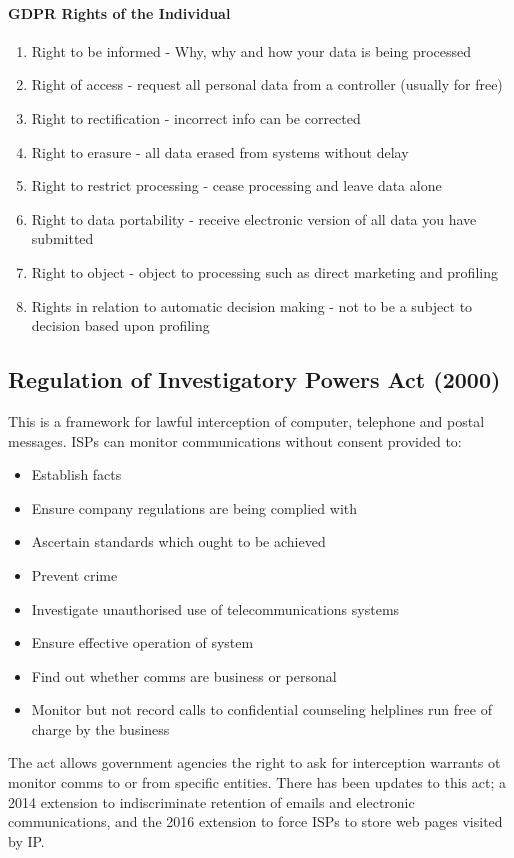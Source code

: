 \paragraph{GDPR Rights of the Individual}
\begin{enumerate}
	\item Right to be informed - Why, why and how your data is being processed
	\item Right of access - request all personal data from a controller (usually for free)
	\item Right to rectification - incorrect info can be corrected
	\item Right to erasure - all data erased from systems without delay
	\item Right to restrict processing - cease processing and leave data alone
	\item Right to data portability - receive electronic version of all data you have submitted
	\item Right to object - object to processing such as direct marketing and profiling
	\item Rights in relation to automatic decision making - not to be a subject to decision based upon profiling
\end{enumerate}
\subsection{Regulation of Investigatory Powers Act (2000)} This is a framework for lawful interception of computer, telephone and postal messages. ISPs can monitor communications without consent provided to:
\begin{itemize}
	\item Establish facts
	\item Ensure company regulations are being complied with
	\item Ascertain standards which ought to be achieved
	\item Prevent crime
	\item Investigate unauthorised use of telecommunications systems
	\item Ensure effective operation of system
	\item Find out whether comms are business or personal
	\item Monitor but not record calls to confidential counseling helplines run free of charge by the business
\end{itemize}
The act allows government agencies the right to ask for interception warrants ot monitor comms to or from specific entities. There has been updates to this act; a 2014 extension to indiscriminate retention of emails and electronic communications, and the 2016 extension to force ISPs to store web pages visited by IP.
